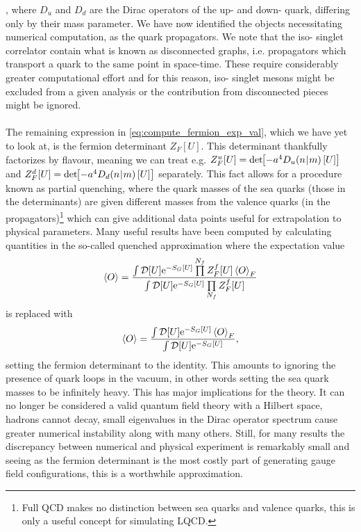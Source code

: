 \documentclass[a4paper,10pt]{article}
\begin{document}
\cite{Gattringer:2010zz}, where $D_u$ and $D_d$ are the Dirac operators of the up- and down- quark, differing only by their mass parameter. We have now identified the objects necessitating numerical computation, as the quark propagators. We note that the iso- singlet correlator contain what is known as disconnected graphs, i.e. propagators which transport a quark to the same point in space-time. These require considerably greater computational effort and for this reason, iso- singlet mesons might be excluded from a given analysis or the contribution from disconnected pieces might be ignored.\\\\The remaining expression in \eqref{eq:compute_fermion_exp_val}, which we have yet to look at, is the fermion determinant $Z_{F}[U]$. This determinant thankfully factorizes by flavour, meaning we can treat e.g. $Z_{F}^u[U] = \operatorname{det}\mkern-5mu\left[ -a^4D_u(n\mkern-4mu\mid \mkern-4mu m)\left[ U \right] \right]$ and $Z_{F}^d[U]=\operatorname{det}\mkern-5mu\left[ -a^4D_d(n\mkern-4mu\mid \mkern-4mu m)\left[ U \right] \right]$ separately. This fact allows for a procedure known as partial quenching, where the quark masses of the sea quarks (those in the determinants) are given different masses from the valence quarks (in the propagators)\footnote{Full QCD makes no distinction between sea quarks and valence quarks, this is only a useful concept for simulating LQCD.} which can give additional data points useful for extrapolation to physical parameters. Many useful results have been computed by calculating quantities in the so-called quenched approximation where the expectation value
\begin{equation}
\braket{O}=\frac{\int \mathcal{D}[U] \mathrm{e}^{-S_{G}[U]} \prod\limits^{N_f} Z_{F}^f[U] \braket{O}_{F}}{\int \mathcal{D}[U] \mathrm{e}^{-S_{G}[U]} \prod\limits_{N_f} Z_{F}^f[U]} 
\end{equation}
is replaced with
\begin{equation}
\braket{O}=\frac{\int \mathcal{D}[U] \mathrm{e}^{-S_{G}[U]}  \braket{O}_{F}}{\int \mathcal{D}[U] \mathrm{e}^{-S_{G}[U]} },
\end{equation}
setting the fermion determinant to the identity. This amounts to ignoring the presence of quark loops in the vacuum, in other words setting the sea quark masses to be infinitely heavy. This has major implications for the theory. It can no longer be considered a valid quantum field theory with a Hilbert space, hadrons cannot decay, small eigenvalues in the Dirac operator spectrum cause greater numerical instability along with many others. Still, for many results the discrepancy between numerical and physical experiment is remarkably small \cite{aoki2003light} and seeing as the fermion determinant is the most costly part of generating gauge field configurations, this is a worthwhile approximation.
\end{document}
